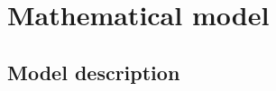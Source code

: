 \documentclass[oneside, 10pt, a4paper, twocolumn]{article}
\begin{document}



\section{Mathematical model}
\label{SectionModel0}

\subsection{Model description}
\label{SectionModel}

\end{document}
